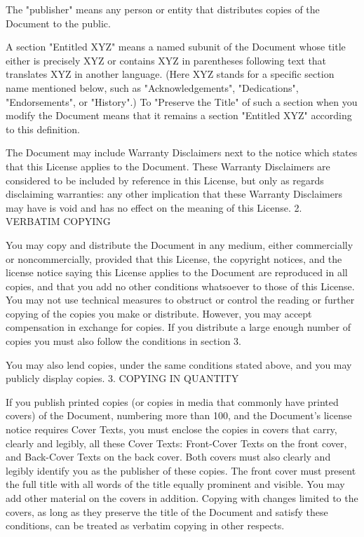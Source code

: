 {\begin{multicols}{4}
The "publisher" means any person or entity that distributes copies of the Document to the public.

A section "Entitled XYZ" means a named subunit of the Document whose title either is precisely XYZ or contains XYZ in parentheses following text that translates XYZ in another language. (Here XYZ stands for a specific section name mentioned below, such as "Acknowledgements", "Dedications", "Endorsements", or "History".) To "Preserve the Title" of such a section when you modify the Document means that it remains a section "Entitled XYZ" according to this definition.

The Document may include Warranty Disclaimers next to the notice which states that this License applies to the Document. These Warranty Disclaimers are considered to be included by reference in this License, but only as regards disclaiming warranties: any other implication that these Warranty Disclaimers may have is void and has no effect on the meaning of this License.
2. VERBATIM COPYING

You may copy and distribute the Document in any medium, either commercially or noncommercially, provided that this License, the copyright notices, and the license notice saying this License applies to the Document are reproduced in all copies, and that you add no other conditions whatsoever to those of this License. You may not use technical measures to obstruct or control the reading or further copying of the copies you make or distribute. However, you may accept compensation in exchange for copies. If you distribute a large enough number of copies you must also follow the conditions in section 3.

You may also lend copies, under the same conditions stated above, and you may publicly display copies.
3. COPYING IN QUANTITY

If you publish printed copies (or copies in media that commonly have printed covers) of the Document, numbering more than 100, and the Document's license notice requires Cover Texts, you must enclose the copies in covers that carry, clearly and legibly, all these Cover Texts: Front-Cover Texts on the front cover, and Back-Cover Texts on the back cover. Both covers must also clearly and legibly identify you as the publisher of these copies. The front cover must present the full title with all words of the title equally prominent and visible. You may add other material on the covers in addition. Copying with changes limited to the covers, as long as they preserve the title of the Document and satisfy these conditions, can be treated as verbatim copying in other respects.


\end{multicols}}
